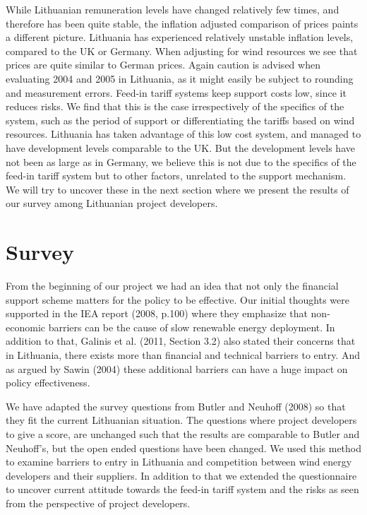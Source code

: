 \documentclass[a4paper, 12pt]{article}
\begin{document}
While Lithuanian remuneration levels have changed relatively few times, and therefore  has been quite stable, the inflation adjusted comparison of prices paints a different picture. Lithuania has experienced relatively unstable inflation levels, compared to the UK or Germany. When adjusting for wind resources we see that prices are quite similar to German prices. Again caution is advised when evaluating 2004 and 2005 in Lithuania, as it might easily be subject to rounding and measurement errors. Feed-in tariff systems keep support costs low, since it reduces risks. We find that this is the case irrespectively of the specifics of the system, such as the period of support or differentiating the tariffs based on wind resources. Lithuania has taken advantage of this low cost system, and managed to have development levels comparable to the UK. But the development levels have not been as large as in Germany, we believe this is not due to the specifics of the feed-in tariff system but to other factors, unrelated to the support mechanism. We will try to uncover these in the next section where we present the results of our survey among Lithuanian project developers.

\section{Survey}
From the beginning of our project we had an idea that not only the financial support scheme matters for the policy to be effective. Our initial thoughts were supported in the IEA report (2008, p.100) where they emphasize that non-economic barriers can be the cause of slow renewable energy deployment. In addition to that, Galinis et al. (2011, Section 3.2) also stated their concerns that in Lithuania, there exists more than financial and technical barriers to entry. And as argued by Sawin (2004) these additional barriers can have a huge impact on policy effectiveness.

We have adapted the survey questions from Butler and Neuhoff (2008) so that they fit the current Lithuanian situation. The questions where project developers to give a score, are unchanged such that the results are comparable to Butler and Neuhoff’s, but the open ended questions have been changed. We used this method to examine barriers to entry in Lithuania and competition between wind energy developers and their suppliers. In addition to that we extended the questionnaire to uncover current attitude towards the feed-in tariff system and the risks as seen from the perspective of project developers.
 
\end{document}
